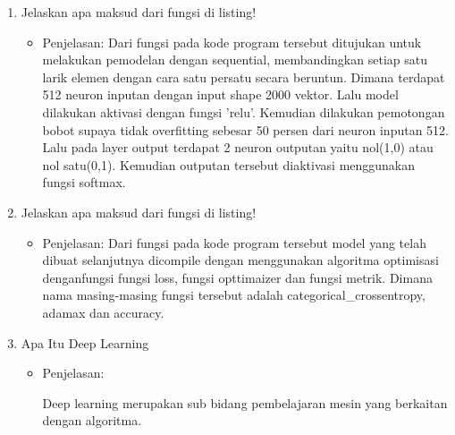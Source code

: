\begin{enumerate}
\item Jelaskan apa maksud dari fungsi di listing!

\begin{itemize}
\item Penjelasan: Dari fungsi pada kode program tersebut ditujukan untuk melakukan pemodelan dengan sequential, membandingkan setiap satu larik elemen dengan cara satu persatu secara beruntun. Dimana terdapat 512 neuron inputan dengan input shape 2000 vektor. Lalu model dilakukan aktivasi dengan fungsi 'relu'. Kemudian dilakukan pemotongan bobot supaya tidak overfitting sebesar 50 persen dari neuron inputan 512. Lalu pada layer output terdapat 2 neuron outputan yaitu nol(1,0) atau nol satu(0,1). Kemudian outputan tersebut diaktivasi menggunakan fungsi softmax.
\par 
\end{itemize}
\par
\par

\item Jelaskan apa maksud dari fungsi di listing!

\begin{itemize}
\item Penjelasan: Dari fungsi pada kode program tersebut model yang telah dibuat selanjutnya dicompile dengan menggunakan algoritma optimisasi denganfungsi fungsi loss, fungsi opttimaizer dan fungsi metrik. Dimana nama masing-masing fungsi tersebut adalah categorical\_crossentropy, adamax dan accuracy.
\par 
\end{itemize}
\par
\par

\item 	Apa Itu Deep Learning
\begin{itemize}
\item Penjelasan: 
\par  Deep learning merupakan sub bidang pembelajaran mesin yang berkaitan dengan algoritma.
\end{itemize}
\par
\par


\end{enumerate}
